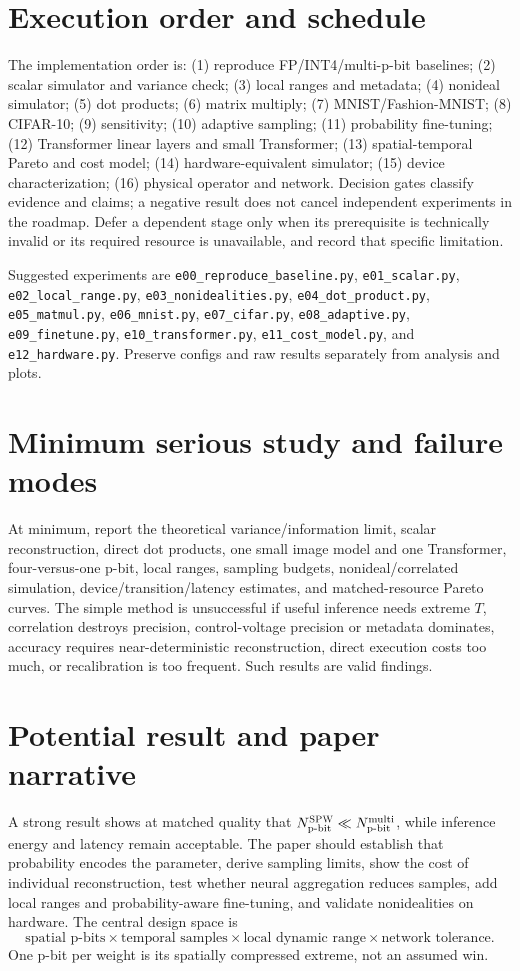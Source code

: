 \documentclass[11pt]{article}
\newcommand{\pbit}{\text{p-bit}}
\newcommand{\ours}{\textsc{SPW}}
\begin{document}
\section{Execution order and schedule}
The implementation order is: (1) reproduce FP/INT4/multi-p-bit baselines; (2) scalar simulator
and variance check; (3) local ranges and metadata; (4) nonideal simulator; (5) dot products;
(6) matrix multiply; (7) MNIST/Fashion-MNIST; (8) CIFAR-10; (9) sensitivity; (10) adaptive
sampling; (11) probability fine-tuning; (12) Transformer linear layers and small Transformer;
(13) spatial-temporal Pareto and cost model; (14) hardware-equivalent simulator; (15) device
characterization; (16) physical operator and network. Decision gates classify evidence and
claims; a negative result does not cancel independent experiments in the roadmap. Defer a
dependent stage only when its prerequisite is technically invalid or its required resource is
unavailable, and record that specific limitation.

Suggested experiments are \texttt{e00\_reproduce\_baseline.py}, \texttt{e01\_scalar.py},
\texttt{e02\_local\_range.py}, \texttt{e03\_nonidealities.py}, \texttt{e04\_dot\_product.py},
\texttt{e05\_matmul.py}, \texttt{e06\_mnist.py}, \texttt{e07\_cifar.py},
\texttt{e08\_adaptive.py}, \texttt{e09\_finetune.py}, \texttt{e10\_transformer.py},
\texttt{e11\_cost\_model.py}, and \texttt{e12\_hardware.py}. Preserve configs and raw
results separately from analysis and plots.

\section{Minimum serious study and failure modes}
At minimum, report the theoretical variance/information limit, scalar reconstruction, direct
dot products, one small image model and one Transformer, four-versus-one p-bit, local ranges,
sampling budgets, nonideal/correlated simulation, device/transition/latency estimates, and
matched-resource Pareto curves. The simple method is unsuccessful if useful inference needs
extreme $T$, correlation destroys precision, control-voltage precision or metadata dominates,
accuracy requires near-deterministic reconstruction, direct execution costs too much, or
recalibration is too frequent. Such results are valid findings.

\section{Potential result and paper narrative}
A strong result shows at matched quality that $N_{\pbit}^{\ours}\ll N_{\pbit}^{\rm multi}$,
while inference energy and latency remain acceptable. The paper should establish that
probability encodes the parameter, derive sampling limits, show the cost of individual
reconstruction, test whether neural aggregation reduces samples, add local ranges and
probability-aware fine-tuning, and validate nonidealities on hardware. The central design
space is
\begin{equation}
 \boxed{\text{spatial p-bits}\times\text{temporal samples}\times
 \text{local dynamic range}\times\text{network tolerance}}.
\end{equation}
One p-bit per weight is its spatially compressed extreme, not an assumed win.
\end{document}
